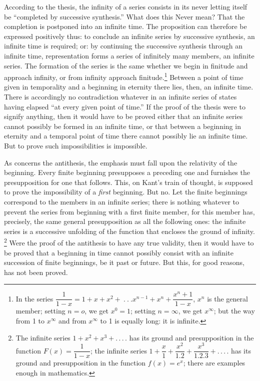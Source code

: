 \documentclass[12pt,a4paper]{book}
\renewcommand{\thefootnote}{*)}
\begin{document}
According to the thesis, the infinity of a series consists in its never letting
itself be ``completed by successive synthesis.'' What does this Never mean? That
the completion is postponed into an infinite time. The proposition can therefore
be expressed positively thus: to conclude an infinite series by successive
synthesis, an infinite time is required; or: by continuing the successive
synthesis through an infinite time, representation forms a series of infinitely
many members, an infinite series.
The formation of the series is the same whether we begin in finitude and approach
infinity, or from infinity approach finitude.\footnote{%
In the series $\dfrac{1}{1-x} = 1 + x + x^2 + \ .\ .\ . x^{n-1} + x^n +
\dfrac{x^n + 1}{1 - x}$, $x^n$ is the general member; setting $n = o$,
we get $x^0 = 1$; setting $n = \infty$, we get $x^\infty$; but the way from 1 to
$x^\infty$ and from $x^\infty$ to 1 is equally long: it is infinite.} Between a
point of time given in temporality and a beginning in eternity there lies, then,
an infinite time. There is accordingly no contradiction whatever in an infinite
series of states having elapsed ``at every given point of time.'' If the proof of
the thesis were to signify anything, then it would have to be proved either that
an infinite series cannot possibly be formed in an infinite time, or that between
a beginning in eternity and a temporal point of time there cannot possibly lie an
infinite time. But to prove such impossibilities is impossible.

As concerns the antithesis, the emphasis must fall upon the relativity of the
beginning. Every finite beginning presupposes a preceding one and furnishes the
presupposition for one that follows. This, on Kant's train of thought, is supposed
to prove the impossibility of a \emph{first} beginning. But no. Let the finite
beginnings correspond to the members in an infinite series; there is nothing
whatever to prevent the series from beginning with a first finite member, for this
member has, precisely, the same general presupposition as all the following ones:
the infinite series is a successive unfolding of the function that encloses the
ground of infinity.%
\renewcommand{\thefootnote}{**)}%
\footnote{%
The infinite series $1 + x^2 + x^3 + .\,.\,.\,.$ has its ground and
presupposition in the function $F(x) = \dfrac{1}{1-x}$; the infinite series
$1 + \dfrac{x}{1} + \dfrac{x^2}{1.2} + \dfrac{x^3}{1.2.3} + .\,.\,.\,.$
has its ground and presupposition in the function $f(x) = e^x$; there are examples
enough in mathematics.}%
\renewcommand{\thefootnote}{*)}
Were the
proof of the antithesis to have any true validity, then it would have to be proved
that a beginning in time cannot possibly consist with an infinite succession of
finite beginnings, be it past or future. But this, for good reasons, has not been
proved.
\end{document}
